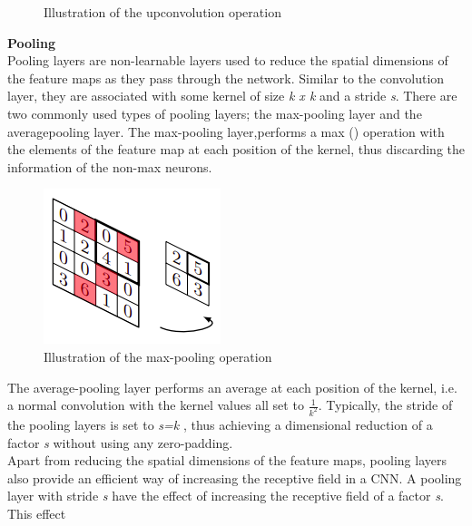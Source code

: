 \begin{enumerate}
\begin{figure}[H]
                        \caption{Illustration of the upconvolution operation}
                    \end{figure}
                    \textbf{Pooling} \\ 
                    \vspace{3mm}
                    Pooling layers are non-learnable layers used to reduce the spatial dimensions of the
                    feature maps as they pass through the network. Similar to the convolution layer,
                    they are associated with some kernel of size \emph{k x k} and a stride \emph{s}. There are two
                    commonly used types of pooling layers; the max-pooling layer and the averagepooling layer. The max-pooling layer,performs a max ()
                    operation with the elements of the feature map at each position of the kernel, thus
                    discarding the information of the non-max neurons.
                    \begin{figure}[H]
                        \centering
                        \includegraphics[width=0.4\linewidth]{img/max-pooling.png}
                        \caption{Illustration of the max-pooling operation}
                    \end{figure}
                    The average-pooling layer performs an average at each position of the kernel, i.e. a
                    normal convolution with the kernel values all set to $\frac{1}{k^2}$. Typically, the stride of
                    the pooling layers is set to \emph{s=k} , thus achieving a dimensional reduction of a factor
                    \emph{s} without using any zero-padding. \\ 
                    \vspace{3mm}
                    Apart from reducing the spatial dimensions of the feature maps, pooling layers also
                    provide an efficient way of increasing the receptive field in a CNN. A pooling layer
                    with stride \emph{s} have the effect of increasing the receptive field of a factor \emph{s}. This effect

\end{enumerate}
